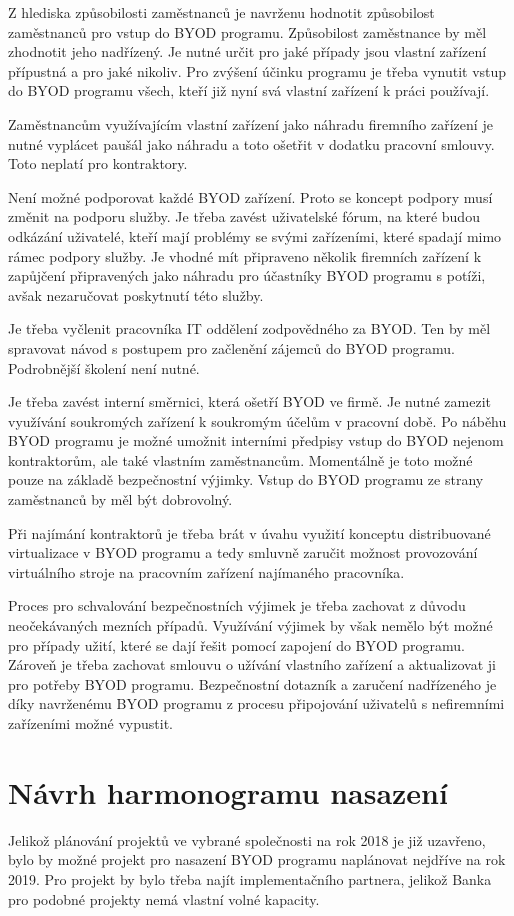 Z hlediska způsobilosti zaměstnanců je navrženu hodnotit způsobilost zaměstnanců pro vstup do BYOD programu. Způsobilost zaměstnance by měl zhodnotit jeho nadřízený. Je nutné určit pro jaké případy jsou vlastní zařízení přípustná a pro jaké nikoliv. Pro zvýšení účinku programu je třeba vynutit vstup do BYOD programu všech, kteří již nyní svá vlastní zařízení k práci používají.

Zaměstnancům využívajícím vlastní zařízení jako náhradu firemního zařízení je nutné vyplácet paušál jako náhradu a toto ošetřit v dodatku pracovní smlouvy. Toto neplatí pro kontraktory.


Není možné podporovat každé BYOD zařízení. Proto se koncept podpory musí změnit na podporu služby. Je třeba zavést uživatelské fórum, na které budou odkázání uživatelé, kteří mají problémy se svými zařízeními, které spadají mimo rámec podpory služby. Je vhodné mít připraveno několik firemních zařízení k zapůjčení připravených jako náhradu pro účastníky BYOD programu s potíži, avšak nezaručovat poskytnutí této služby.

Je třeba vyčlenit pracovníka IT oddělení zodpovědného za BYOD. Ten by měl spravovat návod s postupem pro začlenění zájemců do BYOD programu. Podrobnější školení není nutné.


Je třeba zavést interní směrnici, která ošetří BYOD ve firmě. Je nutné zamezit využívání soukromých zařízení k soukromým účelům v pracovní době. Po náběhu BYOD programu je možné umožnit interními předpisy vstup do BYOD nejenom kontraktorům, ale také vlastním zaměstnancům. Momentálně je toto možné pouze na základě bezpečnostní výjimky. Vstup do BYOD programu ze strany zaměstnanců by měl být dobrovolný. 

Při najímání kontraktorů je třeba brát v úvahu využití konceptu distribuované virtualizace v BYOD programu a tedy smluvně zaručit možnost provozování virtuálního stroje na pracovním zařízení najímaného pracovníka.

Proces pro schvalování bezpečnostních výjimek je třeba zachovat z důvodu neočekávaných mezních případů. Využívání výjimek by však nemělo být možné pro případy užití, které se dají řešit pomocí zapojení do BYOD programu. Zároveň je třeba zachovat smlouvu o užívání vlastního zařízení a aktualizovat ji pro potřeby BYOD programu. Bezpečnostní dotazník a zaručení nadřízeného je díky navrženému BYOD programu z procesu připojování uživatelů s nefiremními zařízeními možné vypustit.

\section{Návrh harmonogramu nasazení}
Jelikož plánování projektů ve vybrané společnosti na rok 2018 je již uzavřeno, bylo by možné projekt pro nasazení BYOD programu naplánovat nejdříve na rok 2019. Pro projekt by bylo třeba najít implementačního partnera, jelikož Banka pro podobné projekty nemá vlastní volné kapacity.

